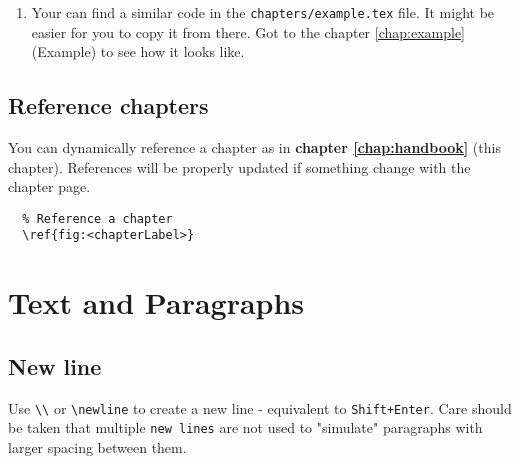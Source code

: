 \begin{enumerate}
\begin{lstlisting}
    Your section content here.
    
    \subsection{First Subsection}

    Your subsection content here.

    \subsubsection{First Subsubsection}

    Your subsubsection content here.
    
    \section*{Unnumbered Section}

    Your unnumbered section content here.\end{lstlisting}
  \item Your can find a similar code in the \verb|chapters/example.tex| file. It might be easier for you to copy it from there. Got to the chapter \ref{chap:example} (Example) to see how it looks like.
\end{enumerate}

\subsection{Reference chapters}

You can dynamically reference a chapter as in \textbf{chapter \ref{chap:handbook}} (this chapter). References will be properly updated if something change with the chapter page.

\begin{lstlisting}
  % Reference a chapter
  \ref{fig:<chapterLabel>}
\end{lstlisting}

\section{Text and Paragraphs}

\subsection{New line}

Use \verb|\\| or \verb|\newline| to create a new line - equivalent to \verb|Shift+Enter|. Care should be taken that multiple \verb|new lines| are not used to "simulate" paragraphs with larger spacing between them.

